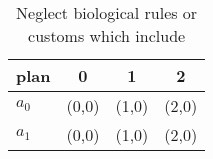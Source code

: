 \documentclass[a4paper]{article}
\begin{document}
\begin{table}
\begin{adjustbox}{width=0.6\columnwidth}
\begin{tabular}{|l|l|l|l|}
\hline
\textbf{plan} & \multicolumn{1}{c|}{\textbf{0}} & \multicolumn{1}{c|}{\textbf{1}} & \multicolumn{1}{c|}{\textbf{2}} \\ \hline
\textbf{$a_0$}  & (0,0) & (1,0) & (2,0) \\ \hline
\textbf{$a_1$}  & (0,0) & (1,0) & (2,0) \\ \hline
\end{tabular}
\end{adjustbox}
\caption{Neglect biological rules or customs which include
}
\end{table}
\end{document}
